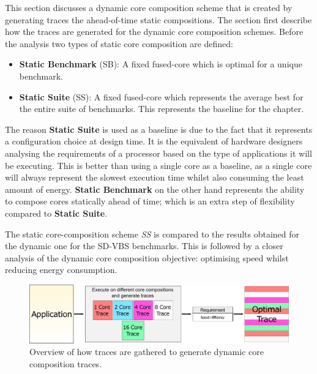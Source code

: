 This section discusses a dynamic core composition scheme that is created by generating traces the ahead-of-time static compositions.
The section first describe how the traces are generated for the dynamic core composition schemes.
Before the analysis two types of static core composition are defined:

\begin{itemize}
	\item \textbf{Static Benchmark} (SB): A fixed fused-core which is optimal for a unique benchmark.
\vspace{-1.2em}
	\item \textbf{Static Suite} (SS): A fixed fused-core which represents the average best for the entire suite of benchmarks. This represents the baseline for the chapter.
\end{itemize}

The reason \textbf{Static Suite} is used as a baseline is due to the fact that it represents a configuration choice at design time.
It is the equivalent of hardware designers analysing the requirements of a processor based on the type of applications it will be executing.
This is better than using a single core as a baseline, as a single core will always represent the slowest execution time whilst also consuming the least amount of energy.
\textbf{Static Benchmark} on the other hand represents the ability to compose cores statically ahead of time; which is an extra step of flexibility compared to \textbf{Static Suite}.

The static core-composition scheme \textit{SS} is compared to the results obtained for the dynamic one for the SD-VBS benchmarks.
This is followed by a closer analysis of the dynamic core composition objective: optimising speed whilst reducing energy consumption.

\begin{figure}[t]
    \centering
	\includegraphics[width=1\textwidth]{cases-paper/graphics/exploration/trace-gathering.pdf}
    \caption{Overview of how traces are gathered to generate dynamic core composition traces.}
    \label{fig:tracegraph}
	\vspace{1em}
\end{figure}

